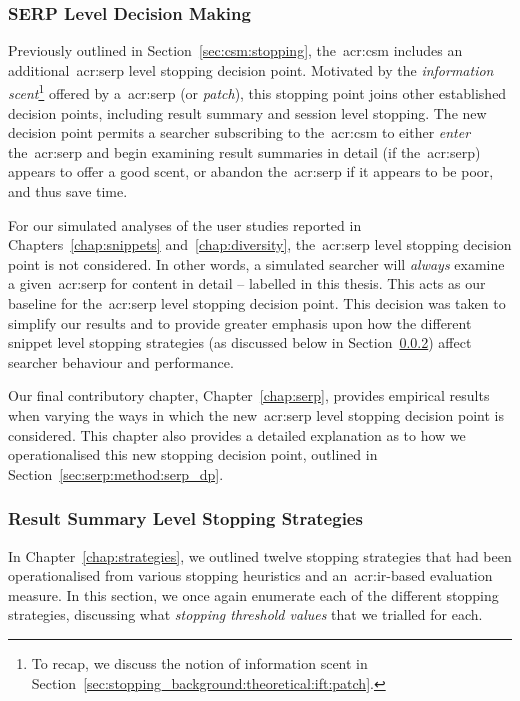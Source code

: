 \vspace*{-2mm}
\subsubsection{SERP Level Decision Making}\label{sec:method:simulation:grounding:serp}
Previously outlined in Section~\ref{sec:csm:stopping}, the~\gls{acr:csm} includes an additional~\gls{acr:serp} level stopping decision point. Motivated by the \emph{information scent}\footnote{To recap, we discuss the notion of information scent in Section~\ref{sec:stopping_background:theoretical:ift:patch}.} offered by a~\gls{acr:serp} (or \emph{patch}), this stopping point joins other established decision points, including result summary and session level stopping. The new decision point permits a searcher subscribing to the~\gls{acr:csm} to either \emph{enter} the~\gls{acr:serp} and begin examining result summaries in detail (if the~\gls{acr:serp}) appears to offer a good scent, or abandon the~\gls{acr:serp} if it appears to be poor, and thus save time.

For our simulated analyses of the user studies reported in Chapters~\ref{chap:snippets} and~\ref{chap:diversity}, the~\gls{acr:serp} level stopping decision point is not considered. In other words, a simulated searcher will \emph{always} examine a given~\gls{acr:serp} for content in detail -- labelled  in this thesis. This acts as our baseline for the~\gls{acr:serp} level stopping decision point. This decision was taken to simplify our results and to provide greater emphasis upon how the different snippet level stopping strategies (as discussed below in Section~\ref{sec:method:simulation:grounding:stopping}) affect searcher behaviour and performance.

Our final contributory chapter, Chapter~\ref{chap:serp}, provides empirical results when varying the ways in which the new~\gls{acr:serp} level stopping decision point is considered. This chapter also provides a detailed explanation as to how we operationalised this new stopping decision point, outlined in Section~\ref{sec:serp:method:serp_dp}.

\subsubsection{Result Summary Level Stopping Strategies}\label{sec:method:simulation:grounding:stopping}
In Chapter~\ref{chap:strategies}, we outlined twelve stopping strategies that had been operationalised from various stopping heuristics and an~\gls{acr:ir}-based evaluation measure. In this section, we once again enumerate each of the different stopping strategies, discussing what \emph{stopping threshold values} that we trialled for each.

